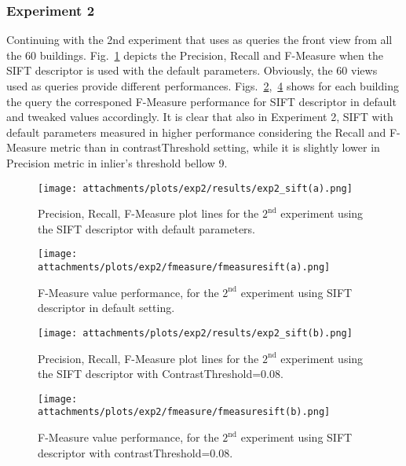       \newpage
      \subsubsection{Experiment 2}\label{detection_exp2} %
	Continuing with the 2nd experiment that uses as queries the front view from all the 60 buildings. Fig.~\ref{fig:exp2_sift_a} depicts the Precision, Recall and F-Measure when the SIFT descriptor is used with the default parameters.
	Obviously,  the 60 views used as queries provide different performances. Figs.~\ref{fig:exp2_sifta_fm},~\ref{fig:exp2_siftb_fm} shows for each building the query the corresponed F-Measure performance for SIFT descriptor in default and tweaked values accordingly.
	It is clear that also in Experiment 2, SIFT with default parameters measured in higher performance considering the Recall and F-Measure metric than in contrastThreshold setting, while it is slightly lower in Precision metric in inlier's threshold bellow 9. 
      
            \begin{figure}[hb!]
              \centering
              \texttt{[image: attachments/plots/exp2/results/exp2\_sift(a).png]}
              \caption{Precision, Recall, F-Measure plot lines for the $2^\text{nd}$ experiment using the SIFT descriptor with default parameters.}
              \label{fig:exp2_sift_a}
            \end{figure}  

           \begin{figure}[ht!] %
              \centering
              \texttt{[image: attachments/plots/exp2/fmeasure/fmeasuresift(a).png]}
              \caption{F-Measure value performance, for the $2^\text{nd}$ experiment using SIFT descriptor in default setting.}
              \label{fig:exp2_sifta_fm}
            \end{figure}            
        
            \begin{figure}[H]
              \centering
              \texttt{[image: attachments/plots/exp2/results/exp2\_sift(b).png]}
              \caption{Precision, Recall, F-Measure plot lines for the $2^\text{nd}$ experiment using the SIFT descriptor with  ContrastThreshold=0.08.}
              \label{fig:exp2_sift_b}
            \end{figure}
 
            \begin{figure}[H]
              \centering
              \texttt{[image: attachments/plots/exp2/fmeasure/fmeasuresift(b).png]}
              \caption{F-Measure value performance, for the $2^\text{nd}$ experiment using SIFT descriptor with contrastThreshold=0.08.}
              \label{fig:exp2_siftb_fm}
            \end{figure}

